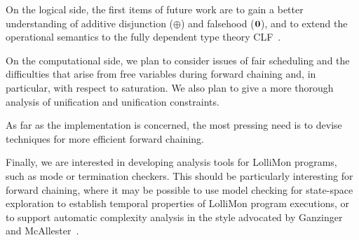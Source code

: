 \documentclass{sig-alt}
\begin{document}
On the logical side, the first items of future work are to gain a better
understanding of additive disjunction ($\oplus$) and falsehood
($\textbf{0}$), and to extend the operational semantics to the fully
dependent type theory CLF~\cite{Watkins02tr}.

On the computational side, we plan to consider issues of fair scheduling
and the difficulties that arise from free variables during forward
chaining and, in particular, with respect to saturation.  We also plan to
give a more thorough analysis of unification and unification
constraints.

As far as the implementation is concerned, the most pressing need is to
devise techniques for more efficient forward chaining.

Finally, we are interested in developing analysis tools for LolliMon
programs, such as mode or termination checkers.  This should be
particularly interesting for forward chaining, where it may be possible
to use model checking for state-space exploration to establish temporal
properties of LolliMon program executions, or to support automatic
complexity analysis in the style advocated by Ganzinger and
McAllester~\cite{Ganzinger01ijcar}.



\end{document}
